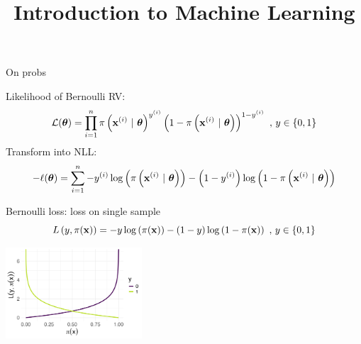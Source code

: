 \documentclass[11pt,compress,t,notes=noshow, xcolor=table]{beamer}
\title{Introduction to Machine Learning}
\begin{document}
    

\begin{vbframe}{On probs}
\begin{small}
Likelihood of Bernoulli RV:
$$
\mathcal{L}(\bm{\theta}) = \prod\limits_{i=1}^n \pi\left(\mathbf{x}^{(i)} ~|~ \bm{\theta}\right)^{y^{(i)}} \left(1-\pi\left(\mathbf{x}^{(i)} ~|~ \bm{\theta}\right)\right)^{1-y^{(i)}} \,\,, \, y \in \{0, 1\}
$$
Transform into NLL:
$$- \ell(\bm{\theta}) = \sum\limits_{i=1}^n - y^{(i)} \log\left(\pi\left(\mathbf{x}^{(i)} ~|~ \bm{\theta}\right)\right) - \left(1-y^{(i)}\right)\log\left(1-\pi\left(\mathbf{x}^{(i)} ~|~ \bm{\theta}\right)\right)$$

Bernoulli loss: loss on single sample
$$
L\left(y, \pi(\mathbf{x})\right) = - y \log \left(\pi(\mathbf{x})\right) - (1 - y) \log \left(1 - \pi(\mathbf{x})\right)\,\,, \, y \in \{0, 1\} 
$$ 
\end{small}


\begin{center}
\includegraphics[width=0.38\textwidth]{figure/bernoulli_prob.png}    
\end{center}

\end{vbframe}
\end{document}
